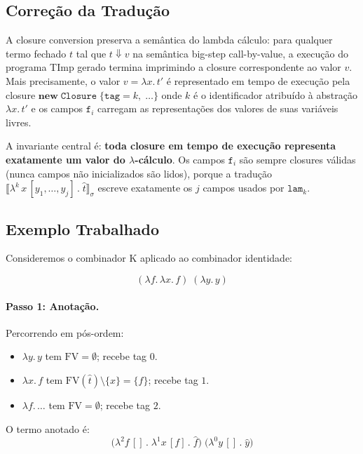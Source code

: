 \subsection{Correção da Tradução}

A closure conversion preserva a semântica do lambda cálculo: para
qualquer termo fechado \(t\) tal que \(t \Downarrow v\) na semântica
big-step call-by-value, a execução do programa TImp gerado termina
imprimindo a closure correspondente ao valor \(v\). Mais precisamente,
o valor \(v = \lambda x.\, t'\) é representado em tempo de execução
pela closure \(\mathbf{new}\;\mathtt{Closure}\;\{\mathtt{tag} =
k,\;\ldots\}\) onde \(k\) é o identificador atribuído à abstração
\(\lambda x.\, t'\) e os campos \(\mathtt{f}_i\) carregam as
representações dos valores de suas variáveis livres.

A invariante central é: \textbf{toda closure em tempo de execução
representa exatamente um valor do $\lambda$-cálculo}. Os campos
\(\mathtt{f}_i\) são sempre closures válidas (nunca campos não
inicializados são lidos), porque a tradução \(\llbracket \lambda^k\,
x\,[y_1,\ldots,y_j]\,.\;\hat{t}\rrbracket_\sigma\) escreve
exatamente os \(j\) campos usados por \(\mathtt{lam}_k\).

\subsection{Exemplo Trabalhado}

Consideremos o combinador K aplicado ao combinador identidade:

\[
  (\lambda f.\,\lambda x.\, f)\;(\lambda y.\, y)
\]

\paragraph{Passo 1: Anotação.}

Percorrendo em pós-ordem:
\begin{itemize}
  \item \(\lambda y.\, y\) tem \(\mathrm{FV} = \emptyset\); recebe tag \(0\).
  \item \(\lambda x.\, f\) tem \(\mathrm{FV}(\hat{t}) \setminus \{x\} = \{f\}\); recebe tag \(1\).
  \item \(\lambda f.\,\ldots\) tem \(\mathrm{FV} = \emptyset\); recebe tag \(2\).
\end{itemize}

O termo anotado é:
\[
  \bigl(\lambda^2 f\,[]\,.\;\lambda^1 x\,[f]\,.\;\hat{f}\bigr)\;
  \bigl(\lambda^0 y\,[]\,.\;\hat{y}\bigr)
\]

